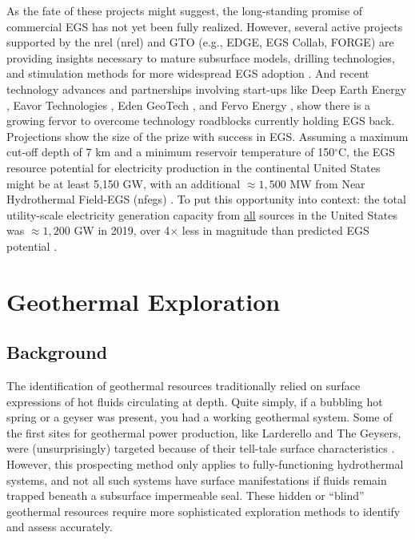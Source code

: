 As the fate of these projects might suggest, the long-standing promise of commercial EGS has not yet been fully realized. However, several active projects supported by the \acrlong{nrel} (\acrshort{nrel}) and GTO (e.g., EDGE, EGS Collab, FORGE) are providing insights necessary to mature subsurface models, drilling technologies, and stimulation methods for more widespread EGS adoption \citep{hamm_geothermal_2021}. And recent technology advances and partnerships involving start-ups like Deep Earth Energy \citep{geoenergy_saskatchewan_2021}, Eavor Technologies \citep{ross_energy_2020}, Eden GeoTech \citep{daso_eden_2020}, and Fervo Energy \citep{moss_google_2021,shieber_geothermal_2021}, show there is a growing fervor to overcome technology roadblocks currently holding EGS back. Projections show the size of the prize with success in EGS. Assuming a maximum cut-off depth of 7 km and a minimum reservoir temperature of 150$^\circ$C, the EGS resource potential for electricity production in the continental United States might be at least 5,150 GW, with an additional $\approx1,500$ MW from Near Hydrothermal Field-EGS (\acrshort{nfegs}) \citep{augustine_geovision_2019}. To put this opportunity into context: the total utility-scale electricity generation capacity from \underline{all} sources in the United States was $\approx1,200$ GW in 2019, over 4$\times$ less in magnitude than predicted EGS potential \citep{eia_electric_2020}.
\vfill

\section{Geothermal Exploration}\label{ch2:geoexp}
\subsection{Background}\label{ch2:expl_background}
The identification of geothermal resources traditionally relied on surface expressions of hot fluids circulating at depth. Quite simply, if a bubbling hot spring or a geyser was present, you had a working geothermal system. Some of the first sites for geothermal power production, like Larderello and The Geysers, were (unsurprisingly) targeted because of their tell-tale surface characteristics \citep[p.\ 111]{glassley_geothermal_2015}. However, this prospecting method only applies to fully-functioning hydrothermal systems, and not all such systems have surface manifestations if fluids remain trapped beneath a subsurface impermeable seal. These hidden or “blind” geothermal resources require more sophisticated exploration methods to identify and assess accurately.

